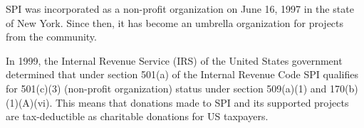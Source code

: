 \documentclass[a4paper]{report}
\begin{document}
SPI was incorporated as a non-profit organization on June 16, 1997 in the state
of New York. Since then, it has become an umbrella organization for projects
from the community.

In 1999, the Internal Revenue Service (IRS) of the United States government
determined that under section 501(a) of the Internal Revenue Code SPI
qualifies for 501(c)(3) (non-profit organization) status under section 509(a)(1)
and 170(b)(1)(A)(vi). This means that donations made to SPI and its
supported projects are tax-deductible as charitable donations for US taxpayers.

\newpage

\pagestyle{empty}


\null
\end{document}
